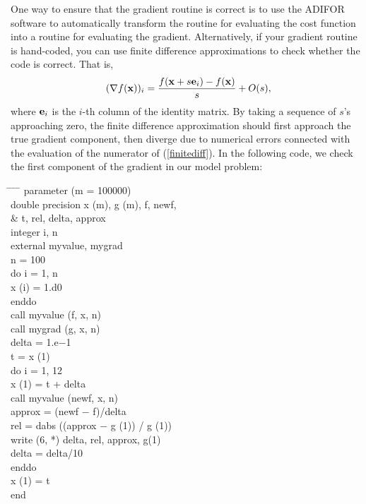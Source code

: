 \documentclass [12pt] {article}
\newcommand{\m}[1]{{\bf{#1}}}
\begin{document}
One way to ensure that the gradient routine is correct is to use
the ADIFOR software to automatically transform
the routine for evaluating the cost function into a routine
for evaluating the gradient.
Alternatively, if your gradient routine is hand-coded, you can use 
finite difference approximations to check whether the code is correct.
That is,
%
\begin{equation}\label{finitediff}
(\nabla f (\m{x}))_i = \frac {f(\m{x} + s \m{e}_i) - f (\m{x})}
{s} + O(s) ,
\end{equation}
%
where $\m{e}_i$ is the $i$-th column of the identity matrix.
By taking a sequence of $s$'s approaching zero, the finite difference
approximation should first approach the true gradient component,
then diverge due to numerical errors connected with the evaluation of the
numerator of (\ref{finitediff}).
In the following code, we check the first component of the gradient
in our model problem:
\begin{tabbing}
\hspace{2em} \= \hspace{2em} \= \hspace{1em} \= \hspace{2em} \= \kill
\>\>\> \sc parameter (m = 100000) \\
\>\>\> \sc double precision x (m), g (m), f, newf,\\
\>\>\&\> \>\sc t, rel, delta, approx \\
\>\>\> \sc integer i, n \\
\>\>\> \sc external myvalue, mygrad \\
\>\>\> \sc n = 100 \\
\>\>\> \sc do i = 1, n \\
\>\>\>\> \sc x (i) = 1.d0 \\
\>\>\> \sc enddo\\
\>\>\> \sc call myvalue (f, x, n)\\
\>\>\> \sc call mygrad (g, x, n)\\
\>\>\> \sc delta = 1.e$-$1\\
\>\>\> \sc t = x (1)\\
\>\>\> \sc do i = 1, 12\\
\>\>\>\> \sc x (1) = t + delta\\
\>\>\>\> \sc call myvalue (newf, x, n)\\
\>\>\>\> \sc approx = (newf $-$ f)/delta\\
\>\>\>\> \sc rel = dabs ((approx $-$ g (1)) / g (1))\\
\>\>\>\> \sc write (6, *) delta, rel, approx, g(1)\\
\>\>\>\> \sc delta = delta/10\\
\>\>\> \sc enddo\\
\>\>\> \sc x (1) = t\\
\>\>\> \sc end
\end{tabbing}
\end{document}
